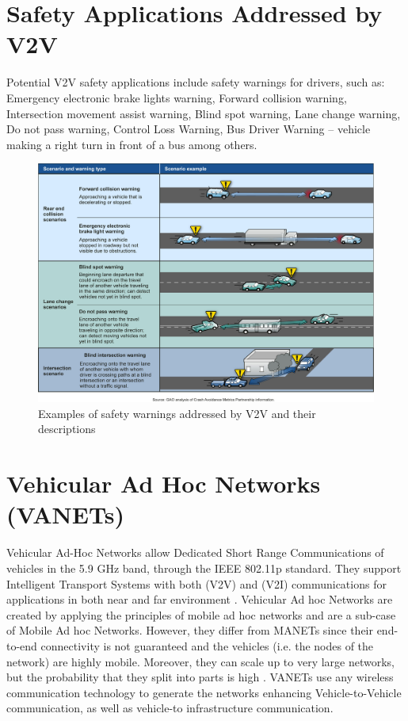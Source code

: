 \documentclass[12pt]{report}
\begin{document}
\section{Safety Applications Addressed by V2V}
Potential V2V safety applications include safety warnings for drivers, such as: Emergency electronic brake lights warning, Forward  collision warning, Intersection movement assist warning, Blind spot warning, Lane change warning, Do not pass warning, Control Loss Warning, Bus Driver Warning – vehicle making a right turn in front of a bus among others.

\begin{figure}[!hb]
	\includegraphics[width=1.0\textwidth]{warnings.png}
	\caption{Examples of safety warnings addressed by V2V and their descriptions \cite{readiness}}
	\label{fig}
\end{figure}

\section{Vehicular Ad Hoc Networks (VANETs)}
Vehicular Ad-Hoc Networks  allow Dedicated Short Range Communications of vehicles in the 5.9 GHz band, through the IEEE 802.11p standard. They support Intelligent Transport Systems  with both (V2V) and (V2I) communications for applications in both near and far environment \cite{protocols}. 
Vehicular Ad hoc Networks are created by applying the principles of mobile ad hoc networks and are a sub-case of Mobile Ad hoc Networks. 
However, they differ from MANETs since their end-to-end connectivity is not guaranteed and the vehicles (i.e. the nodes of the network) are highly mobile. Moreover, they can scale up to very large networks, but the probability that they split into parts is high \cite{protocols}. VANETs use any wireless communication technology to generate the networks enhancing Vehicle-to-Vehicle communication, as well as  vehicle-to infrastructure communication. 
\end{document}
